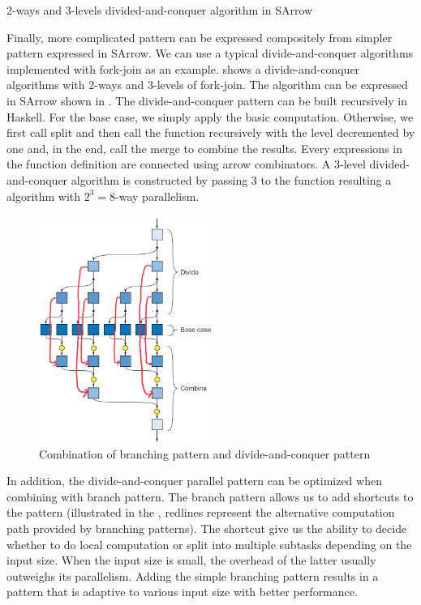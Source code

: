\begin{listing}[ht]
    \inputminted{Haskell}{arrow/dq.hs}
    \caption{2-ways and 3-levels divided-and-conquer algorithm in SArrow}
    \label{SArrow:dq}
\end{listing}
Finally, more complicated pattern can be expressed compositely from simpler pattern expressed in SArrow. We can use a typical divide-and-conquer algorithms implemented with fork-join as an example.  shows a divide-and-conquer algorithms with 2-ways and 3-levels of fork-join. The algorithm can be expressed in SArrow shown in . The divide-and-conquer pattern can be built recursively in Haskell. For the base case, we simply apply the basic computation. Otherwise, we first call split and then call the function recursively with the level decremented by one and, in the end, call the merge to combine the results. Every expressions in the function definition are connected using arrow combinators. A 3-level divided-and-conquer algorithm is constructed by passing 3 to the function resulting a algorithm with $2^3 = 8$-way parallelism.

\begin{figure}[ht]
    \centering
    \includegraphics[width=0.5\textwidth]{arrow/dq2.jpeg}
    \caption{Combination of branching pattern and divide-and-conquer pattern}
    \label{SArrow:fig:brdv}
\end{figure}
In addition, the divide-and-conquer parallel pattern can be optimized when combining with branch pattern. The branch pattern allows us to add shortcuts to the pattern (illustrated in the , redlines represent the alternative computation path provided by branching patterns). The shortcut give us the ability to decide whether to do local computation or split  into multiple subtasks depending on the input size. When the input size is small, the overhead of the latter usually outweighs its parallelism. Adding the simple branching pattern results in a pattern that is adaptive to various input size with better performance.

